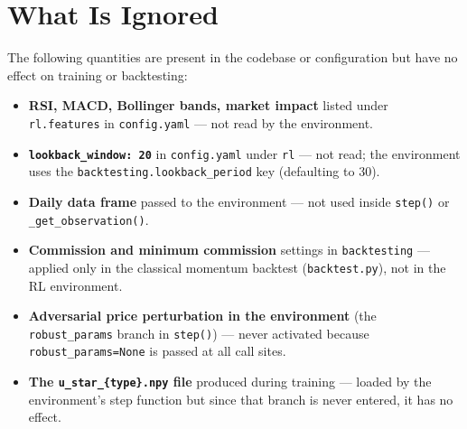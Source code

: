\documentclass[11pt,a4paper]{article}
\begin{document}
\section{What Is Ignored}

The following quantities are present in the codebase or configuration but have no effect on training or backtesting:

\begin{itemize}
  \item \textbf{RSI, MACD, Bollinger bands, market impact} listed under \texttt{rl.features} in \texttt{config.yaml} --- not read by the environment.
  \item \textbf{\texttt{lookback\_window: 20}} in \texttt{config.yaml} under \texttt{rl} --- not read; the environment uses the \texttt{backtesting.lookback\_period} key (defaulting to 30).
  \item \textbf{Daily data frame} passed to the environment --- not used inside \texttt{step()} or \texttt{\_get\_observation()}.
  \item \textbf{Commission and minimum commission} settings in \texttt{backtesting} --- applied only in the classical momentum backtest (\texttt{backtest.py}), not in the RL environment.
  \item \textbf{Adversarial price perturbation in the environment} (the \texttt{robust\_params} branch in \texttt{step()}) --- never activated because \texttt{robust\_params=None} is passed at all call sites.
  \item \textbf{The \texttt{u\_star\_\{type\}.npy} file} produced during training --- loaded by the environment's step function but since that branch is never entered, it has no effect.
\end{itemize}
\end{document}
